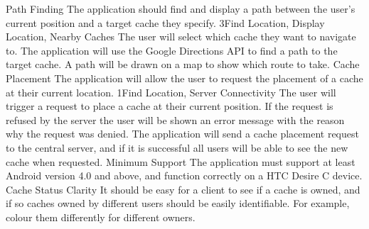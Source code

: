 		\funcreq
			{Path Finding}
			{The application should find and display a path between the user's current position and a target cache they specify.}
			{3}{Find Location, Display Location, Nearby Caches}
			{The user will select which cache they want to navigate to.}
			{The application will use the Google Directions API to find a path to the target cache.}
			{A path will be drawn on a map to show which route to take.}
		\funcreq
			{Cache Placement}
			{The application will allow the user to request the placement of a cache at their current location.}
			{1}{Find Location, Server Connectivity}
			{The user will trigger a request to place a cache at their current position.}
			{If the request is refused by the server the user will be shown an error message with the reason why the request was denied.}
			{The application will send a cache placement request to the central server, and if it is successful all users will be able to see the new cache when requested.}
		\nonfuncreq
			{Minimum Support}
			{The application must support at least Android version 4.0 and above, and function correctly on a HTC Desire C device.}
		\nonfuncreq
			{Cache Status Clarity}
			{It should be easy for a client to see if a cache is owned, and if so caches owned by different users should be easily identifiable. For example, colour them differently for different owners.}

\renewcommand{\arraystretch}{1}

